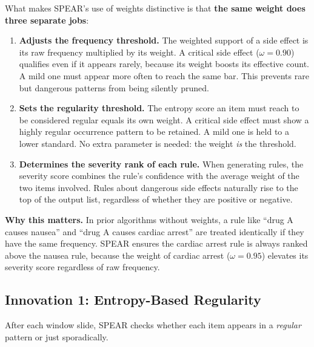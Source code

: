 \documentclass[10pt,twocolumn]{article}
\begin{document}
What makes SPEAR's use of weights distinctive is that \textbf{the
same weight does three separate jobs}:

\begin{enumerate}[leftmargin=*]
  \item \textbf{Adjusts the frequency threshold.} The weighted support
        of a side effect is its raw frequency multiplied by its weight.
        A critical side effect ($\omega = 0.90$) qualifies even if it
        appears rarely, because its weight boosts its effective count.
        A mild one must appear more often to reach the same bar.
        This prevents rare but dangerous patterns from being silently
        pruned.

  \item \textbf{Sets the regularity threshold.} The entropy score an
        item must reach to be considered regular equals its own weight.
        A critical side effect must show a highly regular occurrence
        pattern to be retained. A mild one is held to a lower standard.
        No extra parameter is needed: the weight \emph{is} the threshold.

  \item \textbf{Determines the severity rank of each rule.} When
        generating rules, the severity score combines the rule's
        confidence with the average weight of the two items involved.
        Rules about dangerous side effects naturally rise to the top
        of the output list, regardless of whether they are positive
        or negative.
\end{enumerate}

\begin{tcolorbox}[notebox]
\textbf{Why this matters.} In prior algorithms without weights, a rule
like ``drug A causes nausea'' and ``drug A causes cardiac arrest'' are
treated identically if they have the same frequency. SPEAR ensures
the cardiac arrest rule is always ranked above the nausea rule,
because the weight of cardiac arrest ($\omega = 0.95$) elevates its
severity score regardless of raw frequency.
\end{tcolorbox}

\subsection{Innovation 1: Entropy-Based Regularity}

After each window slide, SPEAR checks whether each item appears in a
\emph{regular} pattern or just sporadically.
\end{document}
